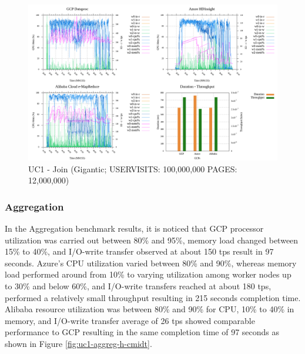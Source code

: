 \documentclass[review]{elsarticle}
\begin{document}
	\begin{figure}[p]
		\caption{UC1 - Join (Gigantic; USERVISITS: 100,000,000 PAGES: 12,000,000)}
		\label{fig:uc1-join-g-cmidt}
		\includegraphics[width=\textwidth]{uc1-join-g-cmidt}
		\centering
	\end{figure}
	
	
	\subsubsection{Aggregation}
	In the Aggregation benchmark results, it is noticed that GCP processor utilization was carried out between 80\% and 95\%, memory load changed between 15\% to 40\%, and I/O-write transfer observed at about 150 tps result in 97 seconds. Azure's CPU utilization varied between 80\% and 90\%, whereas memory load performed around from 10\% to varying utilization among worker nodes up to 30\% and below 60\%, and I/O-write transfers reached at about 180 tps, performed a relatively small throughput resulting in 215 seconds completion time. Alibaba resource utilization was between 80\% and 90\% for CPU, 10\% to 40\% in memory, and I/O-write transfer average of 26 tps showed comparable performance to GCP resulting in the same completion time of 97 seconds as shown in Figure \ref{fig:uc1-aggreg-h-cmidt}.
	
\end{document}
